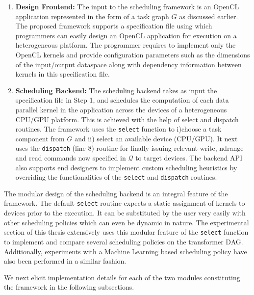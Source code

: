 	\begin{enumerate}
		\item \textbf{Design Frontend: }The input to the scheduling framework is an OpenCL application represented in the form of a task graph $G$ as discussed earlier. The proposed framework supports a specification file using which programmers can easily design an OpenCL application for execution on a heterogeneous platform. The programmer requires to implement only the OpenCL kernels and provide configuration parameters  such as the dimensions of the input/output dataspace along with dependency information between kernels in this specification file.
		\item \textbf{Scheduling Backend: }The scheduling backend takes as input the specification file in Step 1, and schedules the computation of each data parallel kernel in the application across the devices of a heterogeneous CPU/GPU platform. This is achieved with the help of select and dispatch routines. The framework uses the {\tt select} function to i)choose a task component from $G$ and ii) select an available device (CPU/GPU). It next uses the {\tt dispatch} (line 8) routine for finally issuing relevant write, ndrange and read commands now specified in $\mathcal{Q}$ to target devices. The backend API also supports end designers to implement custom scheduling heuristics by overriding the functionalities of the {\tt select} and {\tt dispatch} routines.
	\end{enumerate}
    The modular design of the scheduling backend is an integral feature of the framework. The default {\tt select} routine expects a static assignment of kernels to devices prior to the execution. It can be substituted by the user very easily with other scheduling policies which can even be dynamic in nature. The experimental section of this thesis extensively uses this modular feature of the {\tt select} function to implement and compare several scheduling policies on the transformer DAG. Additionally, experiments with a Machine Learning based scheduling policy have also been performed in a similar fashion. 
    \par We next elicit implementation details for each of the two modules  constituting the framework in the following subsections. 
    

